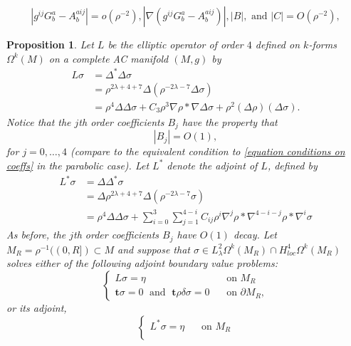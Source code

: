 \documentclass[10pt,a4paper]{amsart}
\newtheorem{prop}{Proposition}
\newcommand{\De}{\Delta}
\newcommand{\Om}{\Omega}
\newcommand{\bt}{\mathbf{t}}
\newcommand{\dd}{\partial}
\newcommand{\de}{\delta}
\newcommand{\la}{\lambda}
\newcommand{\na}{\nabla}
\newcommand{\sg}{\sigma}
\begin{document}
\begin{equation}\label{equation conditions on coeffs}
|g^{ij}G^a_b - A^{aij}_b| = o(\rho^{-2}), |\na (g^{ij}G^a_b - A^{aij}_b)|, |B|, \text{ and } |C| = O(\rho^{-2}),
\end{equation}

\begin{prop}\label{proposition lopatinski shapiro condition}
Let $L$ be the elliptic operator of order $4$ defined on $k$-forms $\Omega^k(M)$ on a complete AC manifold $(M,g)$ by
\begin{align*}
    L\sg &= \De^*\De \sg \\
        &= \rho^{2\la + 4 + 7}\De (\rho^{-2\la -7} \De \sg) \\
        &= \rho^{4}\De \De \sg + C_3 \rho^{3} \na \rho * \na \De \sg + \rho^{2} (\De \rho )(\De \sg).
\end{align*}
Notice that the $j$th order coefficients $B_j$ have the property that
\begin{equation}\label{equation growth of coefficients}
|B_j| = O(1),
\end{equation}
for $j = 0, \ldots, 4$ (compare to the equivalent condition to \eqref{equation conditions on coeffs} in the parabolic case). Let $L^*$ denote the adjoint of $L$, defined by
\begin{align*}
    L^*\sg &= \De\De^* \sg \\
        &= \De \rho^{2\la + 4 + 7}\De (\rho^{-2\la -7} \sg) \\
        &= \rho^{4}\De \De \sg + \sum_{i=0}^3 \sum_{j=1}^{4-i} C_{ij} \rho^i \na^j \rho * \na^{4-i-j} \rho * \na^i \sg
\end{align*}
As before, the $j$th order coefficients $B_j$ have $O(1)$ decay. Let $M_R = \rho^{-1}((0,R]) \subset M$ and suppose that $\sg \in L^2_{\la}\Om^k(M_R) \cap H^4_{loc} \Om^k(M_R)$ solves either of the following adjoint boundary value problems: 
\begin{equation}\label{equation fourth order bvp with LS}
    \left\{
\begin{array}{lr}
L\sg = \eta   & \;\; \text{ on } M_R\\ 
\bt \sg = 0 \;\text{ and }\; \bt \rho \de \sg = 0 & \;\; \text{ on } \dd M_R,
\end{array}
\right.
\end{equation}
or its adjoint,
\begin{equation}\label{equation fourth order bvp with LS adjoint}
    \left\{
\begin{array}{lr}
L^*\sg = \eta   & \;\; \text{ on } M_R\\ 

\end{array}
\end{equation}
\end{prop}
\end{document}
